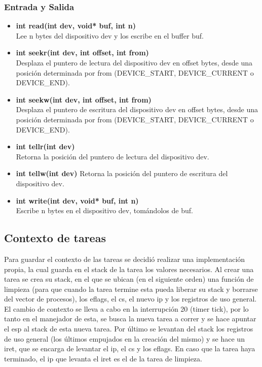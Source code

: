 \documentclass[a4paper,10pt]{article}
\begin{document}
\subsubsection{Entrada y Salida}
\begin{itemize}
 \item \textbf{int read(int dev, void* buf, int n)}\\
  \noindent Lee n bytes del dispositivo dev y los escribe en el buffer buf.
 \item \textbf{int seekr(int dev, int offset, int from)}\\
  \noindent Desplaza el puntero de lectura del dispositivo dev en offset bytes, desde una posición determinada por from (DEVICE\_START, DEVICE\_CURRENT o DEVICE\_END).
 \item \textbf{int seekw(int dev, int offset, int from)}\\
  \noindent Desplaza el puntero de escritura del dispositivo dev en offset bytes, desde una posición determinada por from (DEVICE\_START, DEVICE\_CURRENT o DEVICE\_END).
 \item \textbf{int tellr(int dev)}\\
  \noindent Retorna la posición del puntero de lectura del dispositivo dev.\\
 \item \textbf{int tellw(int dev)}
  \noindent Retorna la posición del puntero de escritura del dispositivo dev.
 \item \textbf{int write(int dev, void* buf, int n)}\\
  \noindent Escribe n bytes en el dispositivo dev, tomándolos de buf.
\end{itemize}

\subsection{Contexto de tareas}
Para guardar el contexto de las tareas se decidió realizar una implementación propia, 
la cual guarda en el stack de la tarea los valores necesarios. Al crear una tarea se crea
su stack, en el que se ubican (en el siguiente orden) una función de limpieza (para que 
cuando la tarea termine esta pueda liberar su stack y borrarse del vector de procesos), 
los eflags, el cs, el nuevo ip y los registros de uso general. \\
El cambio de contexto se lleva a cabo en la interrupción 20 (timer tick), por lo tanto 
en el manejador de esta, se busca la nueva tarea a correr y se hace apuntar el esp al stack 
de esta nueva tarea. Por último se levantan del stack los registros de uso general (los últimos 
empujados en la creación del mismo) y se hace un iret, que se encarga de levantar el ip, el cs 
y los eflags. En caso que la tarea haya terminado, el ip que levanta el iret es el de la tarea 
de limpieza.
\end{document}
